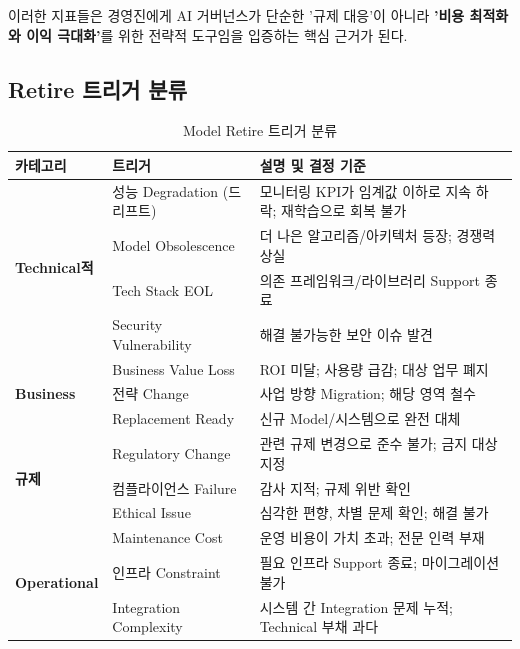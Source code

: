 이러한 지표들은 경영진에게 AI 거버넌스가 단순한 '규제 대응'이 아니라 \textbf{'비용 최적화와 이익 극대화'}를 위한 전략적 도구임을 입증하는 핵심 근거가 된다.

\subsection{Retire 트리거 분류}
\label{sec:12.1.2}

\begin{table}[htbp]
\centering
\caption{Model Retire 트리거 분류}
\label{tab:retirement_triggers}
\begin{tabularx}{\textwidth}{p{2.5cm}p{3.5cm}X}
\toprule
\textbf{카테고리} & \textbf{트리거} & \textbf{설명 및 결정 기준} \\
\midrule
\multirow{4}{*}{\textbf{Technical적}} &
성능 Degradation (드리프트\cite{paleyes2022challenges}) &
모니터링 KPI가 임계값 이하로 지속 하락;
재학습으로 회복 불가 \\
\cmidrule{2-3}
& Model Obsolescence &
더 나은 알고리즘/아키텍처 등장;
경쟁력 상실 \\
\cmidrule{2-3}
& Tech Stack EOL &
의존 프레임워크/라이브러리 Support 종료 \\
\cmidrule{2-3}
& Security Vulnerability &
해결 불가능한 보안 이슈 발견 \\
\midrule
\multirow{3}{*}{\textbf{Business}} &
Business Value Loss &
ROI 미달; 사용량 급감;
대상 업무 폐지 \\
\cmidrule{2-3}
& 전략 Change &
사업 방향 Migration;
해당 영역 철수 \\
\cmidrule{2-3}
& Replacement Ready &
신규 Model/시스템으로 완전 대체 \\
\midrule
\multirow{3}{*}{\textbf{규제}} &
Regulatory Change &
관련 규제 변경으로 준수 불가;
금지 대상 지정 \\
\cmidrule{2-3}
& 컴플라이언스 Failure &
감사 지적; 규제 위반 확인 \\
\cmidrule{2-3}
& Ethical Issue &
심각한 편향, 차별 문제 확인;
해결 불가 \\
\midrule
\multirow{3}{*}{\textbf{Operational}} &
Maintenance Cost &
운영 비용이 가치 초과;
전문 인력 부재 \\
\cmidrule{2-3}
& 인프라 Constraint &
필요 인프라 Support 종료;
마이그레이션 불가 \\
\cmidrule{2-3}
& Integration Complexity &
시스템 간 Integration 문제 누적;
Technical 부채 과다\cite{sculley2015hidden} \\
\bottomrule
\end{tabularx}
\end{table}


